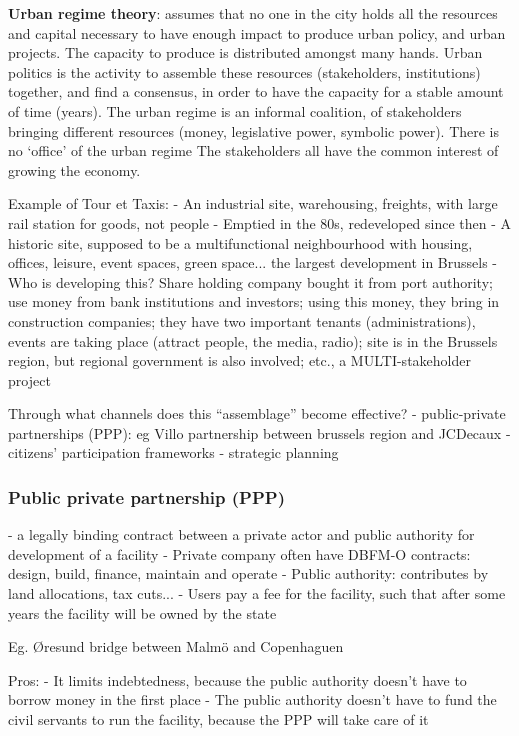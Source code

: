 \documentclass{article}
\begin{document}
\textbf{Urban regime theory}: assumes that no one in the city holds all the resources and capital necessary to have enough impact to produce urban policy, and urban projects. The capacity to produce is distributed amongst many hands.
Urban politics is the activity to assemble these resources (stakeholders, institutions) together, and find a consensus, in order to have the capacity for a stable amount of time (years). The urban regime is an informal coalition, of stakeholders bringing different resources (money, legislative power, symbolic power). There is no `office' of the urban regime
The stakeholders all have the common interest of growing the economy.

Example of Tour et Taxis:
- An industrial site, warehousing, freights, with large rail station for goods, not people
- Emptied in the 80s, redeveloped since then
- A historic site, supposed to be a multifunctional neighbourhood with housing, offices, leisure, event spaces, green space... the largest development in Brussels
- Who is developing this? Share holding company bought it from port authority; use money from bank institutions and investors; using this money, they bring in construction companies; they have two important tenants (administrations), events are taking place (attract people, the media, radio); site is in the Brussels region, but regional government is also involved; etc., a MULTI-stakeholder project

Through what channels does this ``assemblage'' become effective?
- public-private partnerships (PPP): eg Villo partnership between brussels region and JCDecaux
- citizens' participation frameworks
- strategic planning

\subsubsection{Public private partnership (PPP)}
- a legally binding contract between a private actor and public authority for development of a facility
- Private company often have DBFM-O contracts: design, build, finance, maintain and operate 
- Public authority: contributes by land allocations, tax cuts...
- Users pay a fee for the facility, such that after some years the facility will be owned by the state

Eg. Øresund bridge between Malmö and Copenhaguen

Pros:
- It limits indebtedness, because the public authority doesn't have to borrow money in the first place
- The public authority doesn't have to fund the civil servants to run the facility, because the PPP will take care of it
\end{document}
